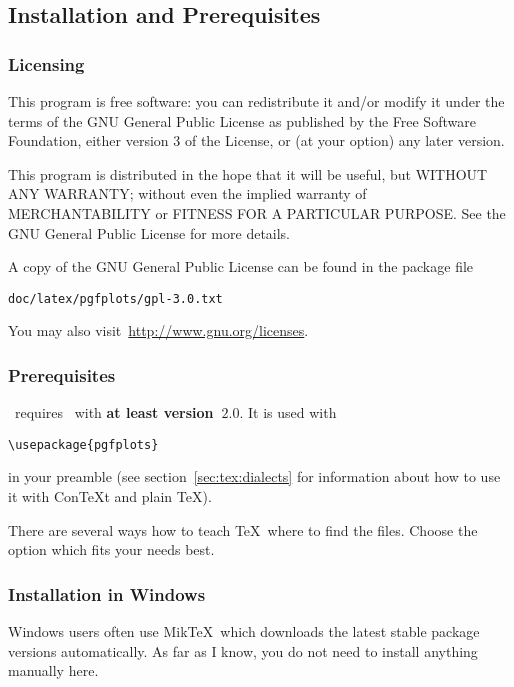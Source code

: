 
\subsection{Installation and Prerequisites}
\subsubsection{Licensing}
This program is free software: you can redistribute it and/or modify
it under the terms of the GNU General Public License as published by
the Free Software Foundation, either version 3 of the License, or
(at your option) any later version.

This program is distributed in the hope that it will be useful,
but WITHOUT ANY WARRANTY; without even the implied warranty of
MERCHANTABILITY or FITNESS FOR A PARTICULAR PURPOSE.  See the
GNU General Public License for more details.

A copy of the GNU General Public License can be found in the package file
\begin{verbatim}
doc/latex/pgfplots/gpl-3.0.txt
\end{verbatim}
You may also visit~\url{http://www.gnu.org/licenses}.

\subsubsection{Prerequisites}
\PGFPlots\ requires \PGF\ with \textbf{at least version~$2.0$}. It is used with
\begin{verbatim}
\usepackage{pgfplots}
\end{verbatim}
in your preamble (see section~\ref{sec:tex:dialects} for information about how to use it with Con{\TeX}t and plain \TeX).


There are several ways how to teach \TeX\ where to find the files. Choose the option which fits your needs best.

\subsubsection{Installation in Windows}
Windows users often use Mik\TeX\ which downloads the latest stable package versions automatically. As far as I know, you do not need to install anything manually here. 

